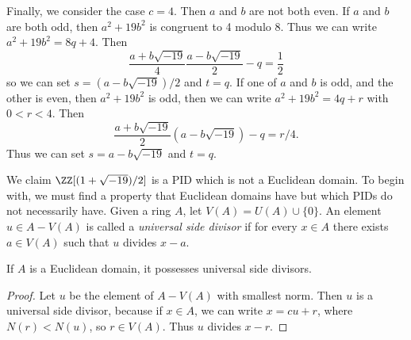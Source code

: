 \begin{example}
    Finally, we consider the case $c = 4$. Then $a$ and $b$ are not both even. If $a$ and $b$ are both odd, then $a^2 + 19b^2$ is congruent to 4 modulo 8. Thus we can write $a^2 + 19b^2 = 8q + 4$. Then
    \[ \frac{a + b \sqrt{-19}}{4} \frac{a - b \sqrt{-19}}{2} - q = \frac{1}{2} \]
    so we can set $s = (a - b \sqrt{-19})/2$ and $t = q$. If one of $a$ and $b$ is odd, and the other is even, then $a^2 + 19b^2$ is odd, then we can write $a^2 + 19b^2 = 4q + r$ with $0 < r < 4$. Then
    \[ \frac{a + b \sqrt{-19}}{2} (a - b\sqrt{-19}) - q = r/4. \]
    Thus we can set $s = a - b \sqrt{-19}$ and $t = q$.
\end{example}

We claim $\ZZ[(1 + \sqrt{-19})/2]$ is a PID which is not a Euclidean domain. To begin with, we must find a property that Euclidean domains have but which PIDs do not necessarily have. Given a ring $A$, let $V(A) = U(A) \cup \{ 0 \}$. An element $u \in A - V(A)$ is called a \emph{universal side divisor} if for every $x \in A$ there exists $a \in V(A)$ such that $u$ divides $x - a$.

\begin{theorem}
    If $A$ is a Euclidean domain, it possesses universal side divisors.
\end{theorem}
\begin{proof}
    Let $u$ be the element of $A - V(A)$ with smallest norm. Then $u$ is a universal side divisor, because if $x \in A$, we can write $x = cu + r$, where $N(r) < N(u)$, so $r \in V(A)$. Thus $u$ divides $x - r$.
\end{proof}

